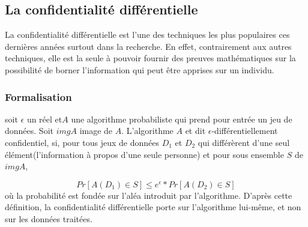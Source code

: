 \subsection{La confidentialité différentielle}
La confidentialité différentielle est l'une des techniques les plus populaires ces dernières années surtout dans la recherche. En effet, contrairement aux autres techniques, elle est la seule à pouvoir fournir des preuves mathématiques sur la possibilité de borner l'information qui peut être apprises sur un individu.

\subsubsection{Formalisation}
soit \begin{math}\epsilon\end{math} un réel et\begin{math}A\end{math} une algorithme probabiliste qui prend pour entrée un jeu de données. Soit \begin{math}imgA\end{math} image de \begin{math}A\end{math}. L'algorithme \begin{math}A\end{math} et dit \begin{math}\epsilon\end{math}-différentiellement confidentiel, si, pour tous jeux de données \begin{math}D_{1}\end{math} et \begin{math}D_{2}\end{math} qui différèrent d'une seul élément(l'information à propos d'une seule personne) et pour sous ensemble \begin{math}S\end{math} de \begin{math}imgA\end{math},

\[
Pr[A(D_{1})\in S] \leq e^{\epsilon} * Pr[A(D_{2})\in S]
\]
où la probabilité est fondée sur l'aléa introduit par l'algorithme. D'après cette définition, la confidentialité différentielle porte sur l'algorithme lui-même, et non sur les données traitées.
